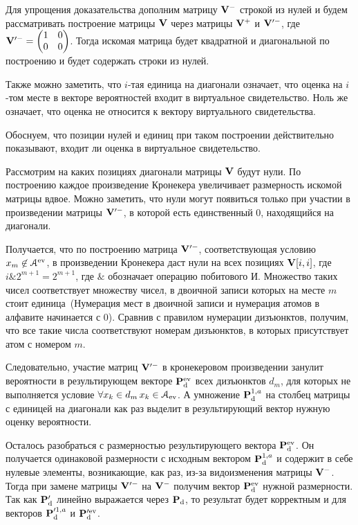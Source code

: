 \begin{Proof}
Для упрощения доказательства дополним матрицу $\mathbf{V}^-$ строкой из нулей и будем рассматривать построение матрицы $\mathbf{V}$ через матрицы $\mathbf{V}^+$ и $\mathbf{V}^{\prime-}$, где $\mathbf{V}^{\prime-} = \begin{pmatrix} 1 & 0 \\ 0 & 0 \end{pmatrix}$. Тогда искомая матрица будет квадратной и диагональной по построению и будет содержать строки из нулей. 

Также можно заметить, что $i$-тая единица на диагонали означает, что оценка на $i$-том месте в векторе вероятностей входит в виртуальное свидетельство. Ноль же означает, что оценка не относится к вектору виртуального свидетельства. 

Обоснуем, что позиции нулей и единиц при таком построении действительно показывают, входит ли оценка в виртуальное свидетельство.

Рассмотрим на каких позициях диагонали матрицы $\mathbf{V}$ будут нули.
По построению каждое произведение Кронекера увеличивает размерность искомой матрицы вдвое.
Можно заметить, что нули могут появиться только при участии в произведении матрицы $\mathbf{V}^{\prime-}$, в которой есть единственный $0$, находящийся на диагонали.

Получается, что по построению матрица $\mathbf{V}^{\prime-}$, соответствующая условию $x_m \not \in \mathcal{A}^{\mathrm{ev}}$, в
произведении Кронекера даст нули на всех позициях $\mathbf{V}[i,i]$, где
$i\&2^{m+1} = 2^{m+1}$, где $\&$ обозначает операцию побитового И. Множество таких чисел соответствует множеству чисел, в двоичной записи которых на месте $m$ стоит единица~(Нумерация мест в двоичной записи и нумерация атомов в алфавите начинается с 0). Сравнив с правилом нумерации дизъюнктов, получим, что все такие числа соответствуют номерам дизъюнктов, в которых присутствует атом с номером $m$. 

Следовательно, участие матриц $\mathbf{V}^{\prime-}$ в кронекеровом произведении занулит вероятности в результирующем векторе $\mathbf{P}_\mathrm{d}^{\mathrm{ev}}$ всех дизъюнктов $d_m$, для которых не выполняется условие $\forall x_k \in d_m \, x_k \in \mathcal{A}_{\mathrm{ev}}$. А умножение $\mathbf{P}_\mathrm{d}^{1,a}$ на столбец матрицы с единицей на диагонали как раз выделит в результирующий вектор нужную оценку вероятности.

Осталось разобраться с размерностью результирующего вектора $\mathbf{P}_\mathrm{d}^{\mathrm{ev}}$. Он получается одинаковой размерности с исходным вектором $\mathbf{P}_\mathrm{d}^{ 1,a}$ и содержит в себе нулевые элементы, возникающие, как раз, из-за видоизменения матрицы $\mathbf{V}^-$. Тогда при замене матрицы  $\mathbf{V}^{\prime-}$ на $\mathbf{V}^-$ получим вектор $\mathbf{P}_\mathrm{d}^{\mathrm{ev}}$ нужной размерности. Так как $\mathbf{P}_\mathrm{d}^{\prime}$ линейно выражается через $\mathbf{P}_\mathrm{d}$, то результат будет корректным и для векторов $\mathbf{P}_\mathrm{d}^{\prime 1,a}$  и $\mathbf{P}_\mathrm{d}^{\prime \mathrm{ev}}$.
\end{Proof}

